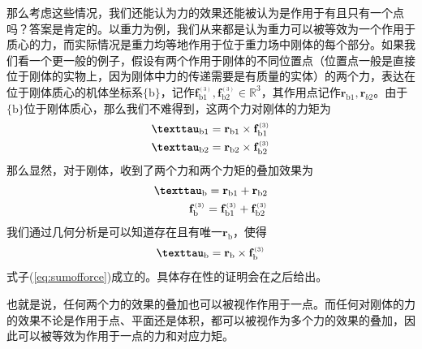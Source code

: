 \documentclass[12pt, a4paper, article, UTF8]{ctexart}
\begin{document}
那么考虑这些情况，我们还能认为力的效果还能被认为是作用于有且只有一个点吗？答案是肯定的。以重力为例，我们从来都是认为重力可以被等效为一个作用于质心的力，而实际情况是重力均等地作用于位于重力场中刚体的每个部分。如果我们看一个更一般的例子，假设有两个作用于刚体的不同位置点（位置点一般是直接位于刚体的实物上，因为刚体中力的传递需要是有质量的实体）的两个力，表达在位于刚体质心的机体坐标系$\{\text{b}\}$，记作$\mathbf{f}^{{}_{(3)}}_\text{b1},\mathbf{f}^{{}_{(3)}}_\text{b2}\in\mathbb{R}^3$，其作用点记作$\mathbf{r}_\text{b1}, \mathbf{r}_{b2}$。由于$\{\text{b}\}$位于刚体质心，那么我们不难得到，这两个力对刚体的力矩为
\begin{align}
\textbf{\texttau}_\text{b1} = \mathbf{r}_\text{b1} \times \mathbf{f}^{{}_{(3)}}_\text{b1} \nonumber \\
\textbf{\texttau}_\text{b2} = \mathbf{r}_\text{b2} \times \mathbf{f}^{{}_{(3)}}_\text{b2} 
\end{align}
那么显然，对于刚体，收到了两个力和两个力矩的叠加效果为
\begin{align}
\textbf{\texttau}_\text{b} = \mathbf{r}_\text{b1} + \mathbf{r}_\text{b2} \\
\mathbf{f}^{{}_{(3)}}_\text{b} = \mathbf{f}^{{}_{(3)}}_\text{b1}  +\mathbf{f}^{{}_{(3)}}_\text{b2}
\end{align}
我们通过几何分析是可以知道存在且有唯一$\mathbf{r}_\text{b}$，使得
\begin{align}
\textbf{\texttau}_\text{b} = \mathbf{r}_\text{b} \times \mathbf{f}^{{}_{(3)}}_\text{b} \label{eq:sumofforce}
\end{align}
式子(\ref{eq:sumofforce})成立的。具体存在性的证明会在之后给出。

也就是说，任何两个力的效果的叠加也可以被视作作用于一点。而任何对刚体的力的效果不论是作用于点、平面还是体积，都可以被视作为多个力的效果的叠加，因此可以被等效为作用于一点的力和对应力矩。
\end{document}
